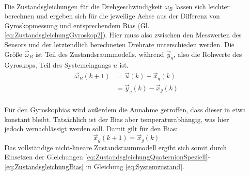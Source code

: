 \documentclass[12pt,a4paper]{article}
\begin{document}
		\\
		Die Zustandsgleichungen für die Drehgeschwindigkeit $\omega_{B}$ lassen sich leichter berechnen und ergeben sich für die jeweilige Achse aus der Differenz von Gyroskopmessung und entsprechendem Bias (Gl. \ref{eq:ZustandsgleichungGyroskop2}). Hier muss also zwischen den Messwerten des Sensors und der letztendlich berechneten Drehrate unterschieden werden. Die Größe $\vec{\omega}_{B}$ ist Teil des Zustandsraummodells, während $\vec{y}_{g}$, also die Rohwerte des Gyroskops, Teil des Systemeingangs $u$ ist.
		\begin{align}
			\vec{\omega}_{B}(k+1)&=\vec{u}(k)-\vec{x}_{g}(k)\label{eq:ZustandsgleichungGyroskop1}\\
			&=\vec{y}_{g}(k)-\vec{x}_{g}(k)\label{eq:ZustandsgleichungGyroskop2}
		\end{align}
		\\
		Für den Gyroskopbias wird außerdem die Annahme getroffen, dass dieser in etwa konstant bleibt. Tatsächlich ist der Bias aber temperaturabhängig, was hier jedoch vernachlässigt werden soll. Damit gilt für den Bias:
		\begin{equation}\label{eq:ZustandsgleichungBias}
			\vec{x}_{g}(k+1)=\vec{x}_{g}(k)
		\end{equation}
		Das vollständige nicht-lineare Zustandsraummodell ergibt sich somit durch Einsetzen der Gleichungen \ref{eq:ZustandsgleichungQuaternionSpeziell}-\ref{eq:ZustandsgleichungBias} in Gleichung \ref{eq:Systemzustand}.
\end{document}
